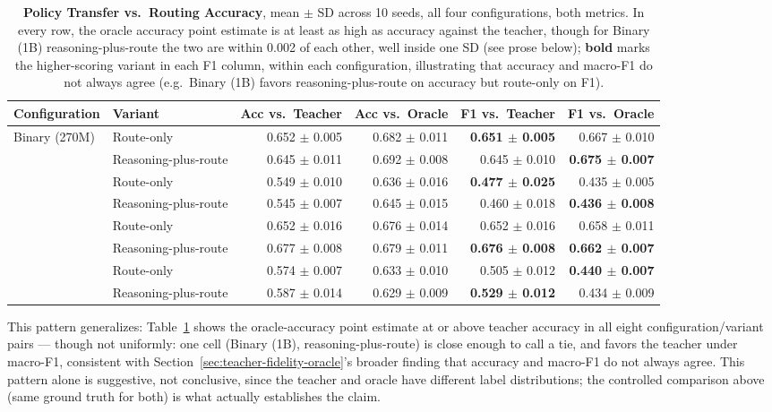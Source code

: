 \documentclass{article}
\begin{document}
\begin{table}[h]
\centering
\caption{\textbf{Policy Transfer vs.\ Routing Accuracy}, mean $\pm$ SD
across 10 seeds, all four configurations, both metrics. In every row,
the oracle accuracy point estimate is at least as high as accuracy
against the teacher, though for Binary (1B) reasoning-plus-route the
two are within 0.002 of each other, well inside one SD (see prose
below); \textbf{bold} marks the higher-scoring variant in each F1
column, within each configuration, illustrating that accuracy and
macro-F1 do not always agree (e.g.\ Binary (1B) favors
reasoning-plus-route on accuracy but route-only on F1).}
\label{tab:teacher-oracle-accuracy}
\small
\begin{tabular}{@{}llrrrr@{}}
\toprule
Configuration & Variant & Acc vs.\ Teacher & Acc vs.\ Oracle & F1 vs.\ Teacher & F1 vs.\ Oracle \\
\midrule
\multirow{2}{*}{Binary (270M)} & Route-only & 0.652 $\pm$ 0.005 & 0.682 $\pm$ 0.011 & \textbf{0.651 $\pm$ 0.005} & 0.667 $\pm$ 0.010 \\
 & Reasoning-plus-route & 0.645 $\pm$ 0.011 & 0.692 $\pm$ 0.008 & 0.645 $\pm$ 0.010 & \textbf{0.675 $\pm$ 0.007} \\
\addlinespace
\multirow{2}{*}{Three-Label} & Route-only & 0.549 $\pm$ 0.010 & 0.636 $\pm$ 0.016 & \textbf{0.477 $\pm$ 0.025} & 0.435 $\pm$ 0.005 \\
 & Reasoning-plus-route & 0.545 $\pm$ 0.007 & 0.645 $\pm$ 0.015 & 0.460 $\pm$ 0.018 & \textbf{0.436 $\pm$ 0.008} \\
 \midrule
\addlinespace
\multirow{2}{*}{Binary (1B)} & Route-only & 0.652 $\pm$ 0.016 & 0.676 $\pm$ 0.014 & 0.652 $\pm$ 0.016 & 0.658 $\pm$ 0.011 \\
 & Reasoning-plus-route & 0.677 $\pm$ 0.008 & 0.679 $\pm$ 0.011 & \textbf{0.676 $\pm$ 0.008} & \textbf{0.662 $\pm$ 0.007} \\
 \addlinespace
\multirow{2}{*}{Three-Label} & Route-only & 0.574 $\pm$ 0.007 & 0.633 $\pm$ 0.010 & 0.505 $\pm$ 0.012 & \textbf{0.440 $\pm$ 0.007} \\
 & Reasoning-plus-route & 0.587 $\pm$ 0.014 & 0.629 $\pm$ 0.009 & \textbf{0.529 $\pm$ 0.012} & 0.434 $\pm$ 0.009 \\
\bottomrule
\end{tabular}
\end{table}

This pattern generalizes: Table~\ref{tab:teacher-oracle-accuracy} shows
the oracle-accuracy point estimate at or above teacher accuracy in all
eight configuration/variant pairs — though not uniformly: one cell
(Binary (1B), reasoning-plus-route) is close enough to call a tie, and
favors the teacher under macro-F1, consistent with
Section~\ref{sec:teacher-fidelity-oracle}'s broader finding that
accuracy and macro-F1 do not always agree. This pattern alone is
suggestive, not conclusive, since the teacher and oracle have
different label distributions; the controlled comparison above (same
ground truth for both) is what actually establishes the claim.
\end{document}
